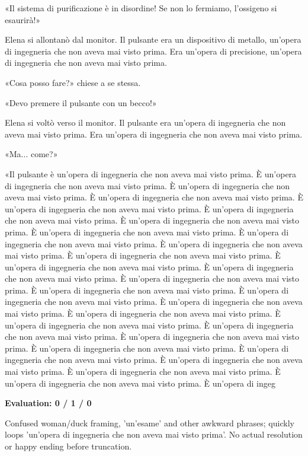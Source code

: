 \documentclass[10pt]{article}
\begin{document}
{\begin{minipage}{\textwidth}
\par\smallskip
«Il sistema di purificazione è in disordine! Se non lo fermiamo, l'ossigeno si esaurirà!»
\par\smallskip
Elena si allontanò dal monitor. Il pulsante era un dispositivo di metallo, un'opera di ingegneria che non aveva mai visto prima. Era un'opera di precisione, un'opera di ingegneria che non aveva mai visto prima.
\par\smallskip
«Cosa posso fare?» chiese a se stessa.
\par\smallskip
«Devo premere il pulsante con un becco!»
\par\smallskip
Elena si voltò verso il monitor. Il pulsante era un'opera di ingegneria che non aveva mai visto prima. Era un'opera di ingegneria che non aveva mai visto prima.
\par\smallskip
«Ma... come?»
\par\smallskip
«Il pulsante è un'opera di ingegneria che non aveva mai visto prima. È un'opera di ingegneria che non aveva mai visto prima. È un'opera di ingegneria che non aveva mai visto prima. È un'opera di ingegneria che non aveva mai visto prima. È un'opera di ingegneria che non aveva mai visto prima. È un'opera di ingegneria che non aveva mai visto prima. È un'opera di ingegneria che non aveva mai visto prima. È un'opera di ingegneria che non aveva mai visto prima. È un'opera di ingegneria che non aveva mai visto prima. È un'opera di ingegneria che non aveva mai visto prima. È un'opera di ingegneria che non aveva mai visto prima. È un'opera di ingegneria che non aveva mai visto prima. È un'opera di ingegneria che non aveva mai visto prima. È un'opera di ingegneria che non aveva mai visto prima. È un'opera di ingegneria che non aveva mai visto prima. È un'opera di ingegneria che non aveva mai visto prima. È un'opera di ingegneria che non aveva mai visto prima. È un'opera di ingegneria che non aveva mai visto prima. È un'opera di ingegneria che non aveva mai visto prima. È un'opera di ingegneria che non aveva mai visto prima. È un'opera di ingegneria che non aveva mai visto prima. È un'opera di ingegneria che non aveva mai visto prima. È un'opera di ingegneria che non aveva mai visto prima. È un'opera di ingegneria che non aveva mai visto prima. È un'opera di ingegneria che non aveva mai visto prima. È un'opera di ingegneria che non aveva mai visto prima. È un'opera di ingeg\par\smallskip
\textbf{Evaluation: 0 / 1 / 0}\par Confused woman/duck framing, 'un'esame' and other awkward phrases; quickly loops 'un'opera di ingegneria che non aveva mai visto prima'. No actual resolution or happy ending before truncation.

\end{minipage}}
\end{document}
